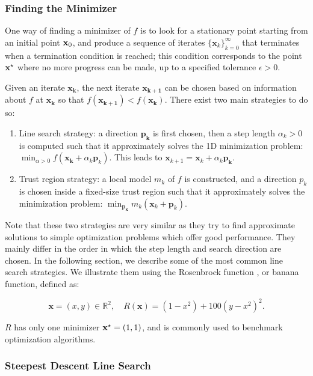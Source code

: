 \subsubsection{Finding the Minimizer}

One way of finding a minimizer of $f$ is to look for a stationary
point starting from an initial point $\mathbf{x}_0$, and produce a
sequence of iterates $\{\mathbf{x}_k\}_{k=0}^{\infty}$ that terminates
when a termination condition is reached; this condition corresponds to
the point $\mathbf{x}^{\star}$ where no more progress can be made, up to a
specified tolerance $\epsilon > 0$.

Given an iterate $\mathbf{x_k}$, the next iterate $\mathbf{x_{k+1}}$
can be chosen based on information about $f$ at $\mathbf{x_k}$ so that
$f(\mathbf{x_{k+1}})<f(\mathbf{x_k})$. There exist two main strategies
to do so:

\begin{enumerate}
\item Line search strategy: a direction $\mathbf{p_k}$ is first
  chosen, then a step length $\alpha_k > 0$ is computed such that it
  approximately solves the 1D minimization problem: $\min_{\alpha>0}
  f(\mathbf{x_k}+\alpha_k\mathbf{p}_k)$. This leads to
  $\mathbf{x}_{k+1}=\mathbf{x}_k+\alpha_k\mathbf{p_k}.$
\item Trust region strategy: a local model $m_k$ of $f$ is
  constructed, and a direction $p_k$ is chosen inside a fixed-size
  trust region such that it approximately solves the minimization
  problem: $\min_{\mathbf{p_k}} m_k(\mathbf{x}_k+\mathbf{p}_k)$.
\end{enumerate}

Note that these two strategies are very similar as they try to find
approximate solutions to simple optimization problems which offer good
performance. They mainly differ in the order in which the step length
and search direction are chosen. In the following section, we describe
some of the most common line search strategies. We illustrate them
using the Rosenbrock function \cite{rosenbrock1960automatic}, or banana
function, defined as:

\begin{equation}
\mathbf{x} = (x,y) \in \mathbb R^2,\quad R(\mathbf{x}) =
(1-x^2)+100(y-x^2)^2.
\end{equation}

$R$ has only one minimizer $\mathbf{x}^{\star} = (1,1)$, and is commonly used
to benchmark optimization algorithms.

\subsubsection{Steepest Descent Line Search}

